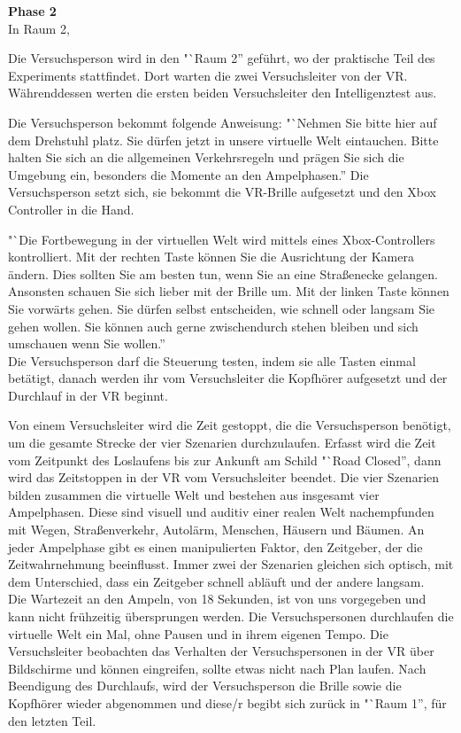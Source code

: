 \documentclass{Bericht}
\begin{document}
\textbf{Phase 2}\\ 
In Raum 2, 

Die Versuchsperson wird in den "`Raum 2'' geführt, wo der praktische Teil des Experiments stattfindet. Dort warten die zwei Versuchsleiter von der VR. Währenddessen werten die ersten beiden Versuchsleiter den Intelligenztest aus.

Die Versuchsperson bekommt folgende Anweisung: "`Nehmen Sie bitte hier auf dem Drehstuhl platz. Sie dürfen jetzt in unsere virtuelle Welt eintauchen. Bitte halten Sie sich an die allgemeinen Verkehrsregeln und prägen Sie sich die Umgebung ein, besonders die Momente an den Ampelphasen.''
Die Versuchsperson setzt sich, sie bekommt die VR-Brille aufgesetzt und den Xbox Controller in die Hand.

"`Die Fortbewegung in der virtuellen Welt wird mittels eines Xbox-Controllers kontrolliert. Mit der rechten Taste können Sie die Ausrichtung der Kamera ändern. Dies sollten Sie am besten tun, wenn Sie an eine Straßenecke gelangen. Ansonsten schauen Sie sich lieber mit der Brille um. Mit der linken Taste können Sie vorwärts gehen. Sie dürfen selbst entscheiden, wie schnell oder langsam Sie gehen wollen. Sie können auch gerne zwischendurch stehen bleiben und sich umschauen wenn Sie wollen.'' \\ 
Die Versuchsperson darf die Steuerung testen, indem sie alle Tasten einmal betätigt, danach werden ihr vom Versuchsleiter die Kopfhörer aufgesetzt und der Durchlauf in der VR beginnt. 

Von einem Versuchsleiter wird die Zeit gestoppt, die die Versuchsperson benötigt, um die gesamte Strecke der vier Szenarien  durchzulaufen. Erfasst wird die Zeit vom Zeitpunkt des Loslaufens bis zur Ankunft am Schild "`Road Closed'', dann wird das Zeitstoppen in der VR vom Versuchsleiter beendet. Die vier Szenarien bilden zusammen die virtuelle Welt und bestehen aus insgesamt vier Ampelphasen. Diese sind visuell und auditiv einer realen Welt nachempfunden mit Wegen, Straßenverkehr, Autolärm, Menschen, Häusern und Bäumen. An jeder Ampelphase gibt es einen manipulierten Faktor, den Zeitgeber, der die Zeitwahrnehmung beeinflusst. Immer zwei der Szenarien gleichen sich optisch, mit dem Unterschied, dass ein Zeitgeber schnell abläuft und der andere langsam. \\



Die Wartezeit an den Ampeln, von 18 Sekunden, ist von uns vorgegeben und kann nicht frühzeitig übersprungen werden. Die Versuchspersonen durchlaufen die virtuelle Welt ein Mal, ohne Pausen und in ihrem eigenen Tempo. Die Versuchsleiter beobachten das Verhalten der Versuchspersonen in der VR über Bildschirme und können eingreifen, sollte etwas nicht nach Plan laufen. Nach Beendigung des Durchlaufs, wird der Versuchsperson die Brille sowie die Kopfhörer wieder abgenommen und diese/r begibt sich zurück in "`Raum 1'', für den letzten Teil.
\end{document}

